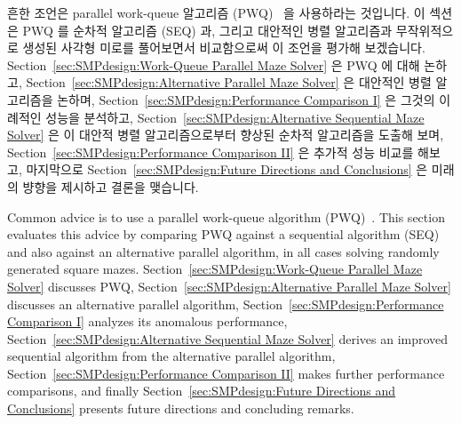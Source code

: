 흔한 조언은 parallel work-queue 알고리즘
(PWQ)~\cite{ETHZurich:FS2011maze,RonFosner2010maze} 을 사용하라는 것입니다.
이 섹션은 PWQ 를 순차적 알고리즘 (SEQ) 과, 그리고 대안적인 병렬 알고리즘과
무작위적으로 생성된 사각형 미로를 풀어보면서 비교함으로써 이 조언을 평가해
보겠습니다.
Section~\ref{sec:SMPdesign:Work-Queue Parallel Maze Solver} 은 PWQ 에 대해
논하고,
Section~\ref{sec:SMPdesign:Alternative Parallel Maze Solver} 은 대안적인 병렬
알고리즘을 논하며,
Section~\ref{sec:SMPdesign:Performance Comparison I} 은 그것의 이례적인 성능을
분석하고,
Section~\ref{sec:SMPdesign:Alternative Sequential Maze Solver} 은 이 대안적
병렬 알고리즘으로부터 향상된 순차적 알고리즘을 도출해 보며,
Section~\ref{sec:SMPdesign:Performance Comparison II} 은 추가적 성능 비교를
해보고, 마지막으로
Section~\ref{sec:SMPdesign:Future Directions and Conclusions} 은 미래의 뱡향을
제시하고 결론을 맺습니다.

\iffalse

Common advice is to use a parallel work-queue algorithm
(PWQ)~\cite{ETHZurich:FS2011maze,RonFosner2010maze}.
This section evaluates this advice by comparing PWQ
against a sequential algorithm (SEQ) and also against
an alternative parallel algorithm, in all cases solving randomly generated
square mazes.
Section~\ref{sec:SMPdesign:Work-Queue Parallel Maze Solver} discusses PWQ,
Section~\ref{sec:SMPdesign:Alternative Parallel Maze Solver} discusses an alternative
parallel algorithm,
Section~\ref{sec:SMPdesign:Performance Comparison I} analyzes its anomalous performance,
Section~\ref{sec:SMPdesign:Alternative Sequential Maze Solver} derives an improved
sequential algorithm from the alternative parallel algorithm,
Section~\ref{sec:SMPdesign:Performance Comparison II} makes further performance
comparisons,
and finally
Section~\ref{sec:SMPdesign:Future Directions and Conclusions}
presents future directions and concluding remarks.

